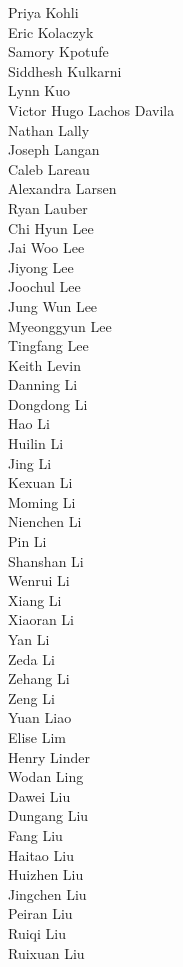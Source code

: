 Priya Kohli\\
Eric Kolaczyk\\
Samory Kpotufe\\
Siddhesh Kulkarni\\
Lynn Kuo\\
Victor Hugo Lachos Davila\\
Nathan Lally\\
Joseph Langan\\
Caleb Lareau\\
Alexandra Larsen\\
Ryan Lauber\\
Chi Hyun Lee\\
Jai Woo Lee\\
Jiyong Lee\\
Joochul Lee\\
Jung Wun Lee\\
Myeonggyun Lee\\
Tingfang Lee\\
Keith Levin\\
Danning Li\\
Dongdong Li\\
Hao Li\\
Huilin Li\\
Jing Li\\
Kexuan Li\\
Moming Li\\
Nienchen Li\\
Pin Li\\
Shanshan Li\\
Wenrui Li\\
Xiang Li\\
Xiaoran Li\\
Yan Li\\
Zeda Li\\
Zehang Li\\
Zeng Li\\
Yuan Liao\\
Elise Lim\\
Henry Linder\\
Wodan Ling\\
Dawei Liu\\
Dungang Liu\\
Fang Liu\\
Haitao Liu\\
Huizhen Liu\\
Jingchen Liu\\
Peiran Liu\\
Ruiqi Liu\\
Ruixuan Liu\\
